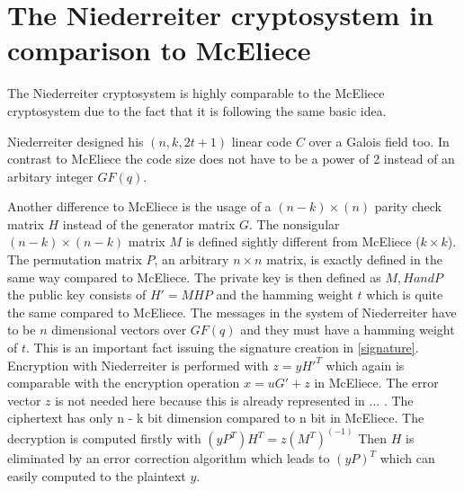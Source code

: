 
\section{The Niederreiter cryptosystem in comparison to McEliece}
\label{niederreither}
The Niederreiter cryptosystem is highly comparable to the McEliece cryptosystem due to the fact that it is following the same basic idea. 

Niederreiter designed his $(n, k, 2t + 1)$ linear code $C$ over a Galois field too. In contrast to McEliece the code size does not have to be a power of 2 instead of an arbitary integer $GF(q)$. 

Another difference to McEliece is the usage of a $(n - k) \times (n)$ parity check matrix $H$ instead of  the generator matrix $G$. %
The nonsigular $(n - k) \times (n - k)$ matrix $M$ is defined sightly different from McEliece ($k \times k$).%
The permutation matrix $P$, an arbitrary $n \times n$ matrix, is exactly defined in the same way compared to McEliece.
The private key is then defined as $M, H and P$ the public key consists of $H' = MHP$ and the hamming weight $t$ which is quite the same compared to McEliece.
The messages in the system of Niederreiter have to be $n$ dimensional vectors over $GF(q)$ and they must have a hamming weight of $t$. This is an important fact issuing the signature creation in \autoref{signature}.
Encryption with Niederreiter is performed with $z = yH'^T$ which again is comparable with the encryption operation $x = uG' + z$ in McEliece. The error vector $z$ is not needed here because this is already represented in ... . The ciphertext has only n - k bit dimension compared to n bit in McEliece. 
The decryption is computed firstly with $(yP^T)H^T = z(M^T)^(-1)$ Then $H$ is eliminated by an error correction algorithm which leads to $(yP)^T$ which can easily computed to the plaintext $y$. \cite{sendrier2011niederreiter}\cite{li1994equivalence}\cite{niederreiter1986knapsack}



